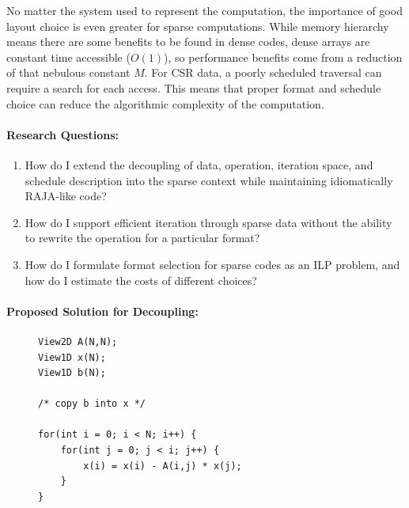\documentclass{article}
\begin{document}
No matter the system used to represent the computation, the importance of good layout choice is even greater for sparse computations.
While memory hierarchy means there are some benefits to be found in dense codes, dense arrays are constant time accessible ($O(1)$), so performance benefits come from a reduction of that nebulous constant $M$.
For CSR data, a poorly scheduled traversal can require a search for each access.
This means that proper format and schedule choice can reduce the algorithmic complexity of the computation.


\paragraph{Research Questions:}
\begin{enumerate}[label=Q3.\arabic*]
    \item How do I extend the decoupling of data, operation, iteration space, and schedule description into the sparse context while maintaining idiomatically RAJA-like code? \label{q:extend}
    \item How do I support efficient iteration through sparse data without the ability to rewrite the operation for a particular format? \label{q:iteration}
    \item How do I formulate format selection for sparse codes as an ILP problem, and how do I estimate the costs of different choices? \label{q:spselect}
\end{enumerate}


\paragraph{Proposed Solution for Decoupling:}


\begin{figure}
\begin{lstlisting}[label={ForwardSolveC},caption={C-like implementation of forward substitution using Views}]
View2D A(N,N);
View1D x(N);
View1D b(N);

/* copy b into x */

for(int i = 0; i < N; i++) {
    for(int j = 0; j < i; j++) {
        x(i) = x(i) - A(i,j) * x(j);
    }
}
\end{lstlisting}
\end{figure}
\end{document}
